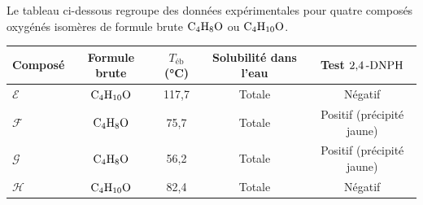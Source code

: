 \documentclass[11pt]{article}
\begin{document}
\begin{exercice}
Le tableau ci-dessous regroupe des données expérimentales pour quatre composés oxygénés isomères de formule brute $\ce{C4H8O}$ ou $\ce{C4H10O}$.

\begin{center}
\begin{tabular}{lcccc}
\toprule
Composé & Formule brute & $T_{\text{éb}}$ (\si{\celsius}) & Solubilité dans l'eau & Test $\ce{2,4\text{-}DNPH}$ \\
\midrule
$\mathcal{E}$ & $\ce{C4H10O}$ & 117,7 & Totale & Négatif \\
$\mathcal{F}$ & $\ce{C4H8O}$ & 75,7 & Totale & Positif (précipité jaune) \\
$\mathcal{G}$ & $\ce{C4H8O}$ & 56,2 & Totale & Positif (précipité jaune) \\
$\mathcal{H}$ & $\ce{C4H10O}$ & 82,4 & Totale & Négatif \\
\bottomrule
\end{tabular}
\end{center}


\end{exercice}
\end{document}
